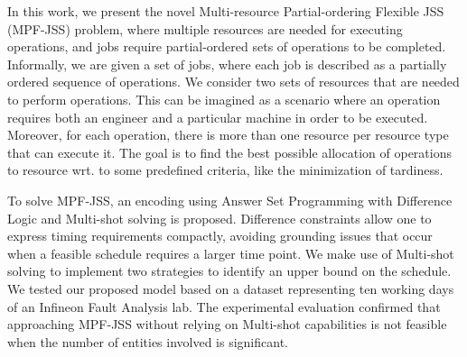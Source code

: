 \documentclass[submission,copyright,creativecommons]{eptcs}
\newcommand{\jss}{MPF-JSS\xspace}
\begin{document}
In this work, we present the novel Multi-resource Partial-ordering Flexible JSS (MPF-JSS) problem, where multiple resources are needed for executing operations, and jobs require partial-ordered sets of operations to be completed. Informally, we are given a set of jobs, where each job is described as a partially ordered sequence of operations. We consider two sets of resources that are needed to perform operations. This can be imagined as a scenario where an operation requires both an engineer and a particular machine in order to be executed. Moreover, for each operation, there is more than one resource per resource type that can execute it. 
The goal is to find the best possible allocation of operations to resource wrt. to some predefined criteria, like the minimization of tardiness. 

To solve MPF-JSS, an encoding using Answer Set Programming with Difference Logic \cite{gebser2016theory} and Multi-shot solving \cite{gebser2019multi} is proposed. Difference constraints allow one to express timing requirements compactly, avoiding grounding issues that occur when a feasible schedule requires a larger time point. We make use of Multi-shot solving to implement two strategies to identify an upper bound on the schedule.
We tested our proposed model based on a dataset representing ten working days of an Infineon Fault Analysis lab. The experimental evaluation confirmed that approaching \jss without relying on Multi-shot capabilities is not feasible when the number of entities involved is significant.  %
\end{document}
